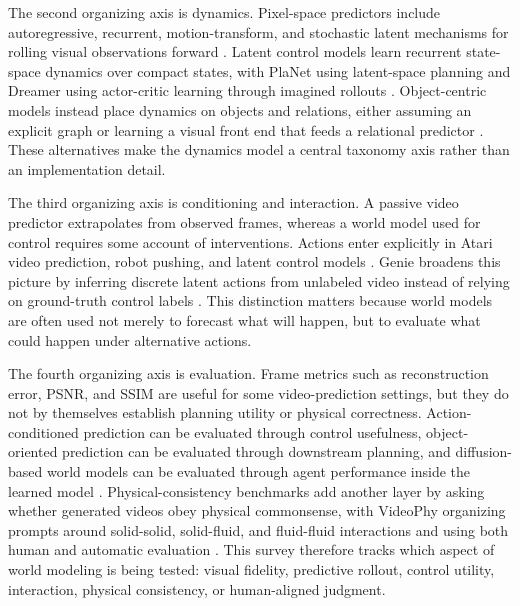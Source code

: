 The second organizing axis is dynamics. Pixel-space predictors include autoregressive, recurrent, motion-transform, and stochastic latent mechanisms for rolling visual observations forward \cite{finn2016_physical_interaction_video_prediction_prov,babaeizadeh2018_sv2p_prov}. Latent control models learn recurrent state-space dynamics over compact states, with PlaNet using latent-space planning and Dreamer using actor-critic learning through imagined rollouts \cite{hafner2019_planet_prov,hafner2020_dreamer_prov}. Object-centric models instead place dynamics on objects and relations, either assuming an explicit graph or learning a visual front end that feeds a relational predictor \cite{battaglia2016_interaction_networks_prov,watters2017_visual_interaction_networks_prov}. These alternatives make the dynamics model a central taxonomy axis rather than an implementation detail.

The third organizing axis is conditioning and interaction. A passive video predictor extrapolates from observed frames, whereas a world model used for control requires some account of interventions. Actions enter explicitly in Atari video prediction, robot pushing, and latent control models \cite{oh2015_action_conditional_video_prediction_prov,finn2016_physical_interaction_video_prediction_prov,hafner2019_planet_prov,hafner2020_dreamer_prov}. Genie broadens this picture by inferring discrete latent actions from unlabeled video instead of relying on ground-truth control labels \cite{bruce2024_genie_prov}. This distinction matters because world models are often used not merely to forecast what will happen, but to evaluate what could happen under alternative actions.

The fourth organizing axis is evaluation. Frame metrics such as reconstruction error, PSNR, and SSIM are useful for some video-prediction settings, but they do not by themselves establish planning utility or physical correctness. Action-conditioned prediction can be evaluated through control usefulness, object-oriented prediction can be evaluated through downstream planning, and diffusion-based world models can be evaluated through agent performance inside the learned model \cite{oh2015_action_conditional_video_prediction_prov,janner2019_o2p2_prov,alonso2024_diamond_prov}. Physical-consistency benchmarks add another layer by asking whether generated videos obey physical commonsense, with VideoPhy organizing prompts around solid-solid, solid-fluid, and fluid-fluid interactions and using both human and automatic evaluation \cite{bansal2025_videophy_prov}. This survey therefore tracks which aspect of world modeling is being tested: visual fidelity, predictive rollout, control utility, interaction, physical consistency, or human-aligned judgment.


